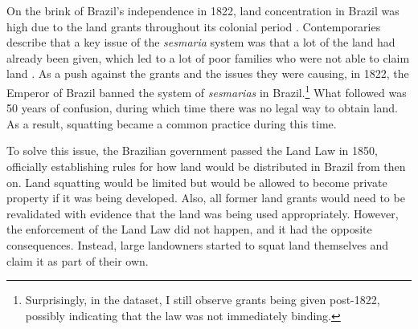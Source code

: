 \documentclass[11pt]{article}
\begin{document}
On the brink of Brazil's independence in 1822, land concentration in Brazil was high due to the land grants throughout its colonial period \parencite{Smith1972-dv}.
Contemporaries describe that a key issue of the \textit{sesmaria} system was that a lot of the land had already been given, which led to a lot of poor families who were not able to claim land \parencite[p.~42-43]{Lima1954-td}.
As a push against the grants and the issues they were causing, in 1822, the Emperor of Brazil banned the system of \textit{sesmarias} in Brazil.\footnote{Surprisingly, in the dataset, I still observe grants being given post-1822, possibly indicating that the law was not immediately binding.}
What followed was 50 years of confusion, during which time there was no legal way to obtain land. 
As a result, squatting became a common practice during this time.

To solve this issue, the Brazilian government passed the Land Law in 1850, officially establishing rules for how land would be distributed in Brazil from then on. 
Land squatting would be limited but would be allowed to become private property if it was being developed.
Also, all former land grants would need to be revalidated with evidence that the land was being used appropriately.
However, the enforcement of the Land Law did not happen, and it had the opposite consequences.
Instead, large landowners started to squat land themselves and claim it as part of their own.



\end{document}
